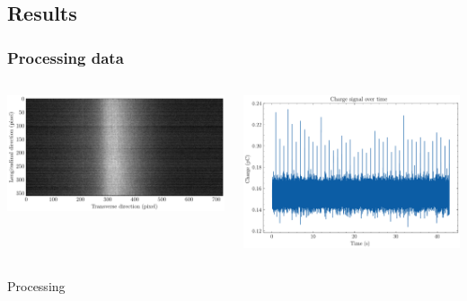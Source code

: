 \subsection{Results}
\begin{frame}
  \frametitle{Processing data}
  \begin{columns}[T]
    \begin{column}{0.45\textwidth}
      \includegraphics[width=1\textwidth]{04_Test/fig/fig000_image_beam}
    \end{column}
    \begin{column}{0.45\textwidth}
      \includegraphics[width=1\textwidth]{04_Test/fig/fig000_strips_signal}
    \end{column}
  \end{columns}
  \begin{columns}[T]
    \begin{column}{0.45\textwidth}
      \begin{block}{Processing}
        \begin{enumerate}

\end{enumerate}
\end{block}
\end{column}
\end{columns}
\end{frame}
